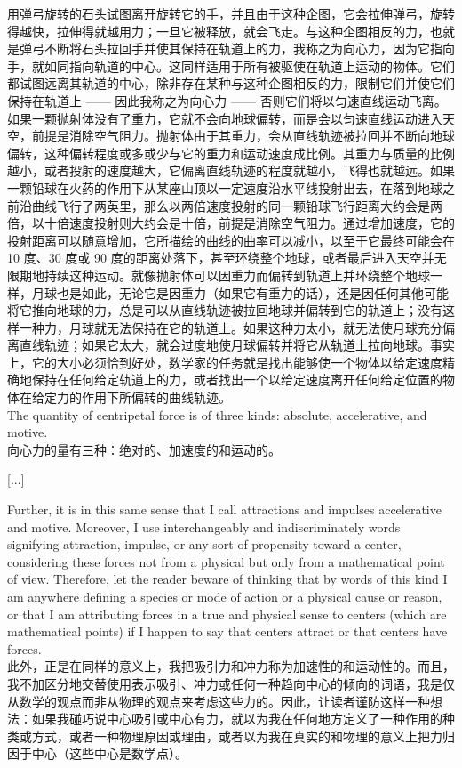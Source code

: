 \documentclass{article}
\begin{document}
用弹弓旋转的石头试图离开旋转它的手，并且由于这种企图，它会拉伸弹弓，旋转得越快，拉伸得就越用力；一旦它被释放，就会飞走。与这种企图相反的力，也就是弹弓不断将石头拉回手并使其保持在轨道上的力，我称之为向心力，因为它指向手，就如同指向轨道的中心。这同样适用于所有被驱使在轨道上运动的物体。它们都试图远离其轨道的中心，除非存在某种与这种企图相反的力，限制它们并使它们保持在轨道上 —— 因此我称之为向心力 —— 否则它们将以匀速直线运动飞离。如果一颗抛射体没有了重力，它就不会向地球偏转，而是会以匀速直线运动进入天空，前提是消除空气阻力。抛射体由于其重力，会从直线轨迹被拉回并不断向地球偏转，这种偏转程度或多或少与它的重力和运动速度成比例。其重力与质量的比例越小，或者投射的速度越大，它偏离直线轨迹的程度就越小，飞得也就越远。如果一颗铅球在火药的作用下从某座山顶以一定速度沿水平线投射出去，在落到地球之前沿曲线飞行了两英里，那么以两倍速度投射的同一颗铅球飞行距离大约会是两倍，以十倍速度投射则大约会是十倍，前提是消除空气阻力。通过增加速度，它的投射距离可以随意增加，它所描绘的曲线的曲率可以减小，以至于它最终可能会在 10 度、30 度或 90 度的距离处落下，甚至环绕整个地球，或者最后进入天空并无限期地持续这种运动。就像抛射体可以因重力而偏转到轨道上并环绕整个地球一样，月球也是如此，无论它是因重力（如果它有重力的话），还是因任何其他可能将它推向地球的力，总是可以从直线轨迹被拉回地球并偏转到它的轨道上；没有这样一种力，月球就无法保持在它的轨道上。如果这种力太小，就无法使月球充分偏离直线轨迹；如果它太大，就会过度地使月球偏转并将它从轨道上拉向地球。事实上，它的大小必须恰到好处，数学家的任务就是找出能够使一个物体以给定速度精确地保持在任何给定轨道上的力，或者找出一个以给定速度离开任何给定位置的物体在给定力的作用下所偏转的曲线轨迹。\\

\noindent The quantity of centripetal force is of three kinds: absolute, accelerative, and motive.\\
向心力的量有三种：绝对的、加速度的和运动的。\\

\begin{center}
    [...]
\end{center}

\noindent Further, it is in this same sense that I call attractions and impulses accelerative and motive. Moreover, I use interchangeably and indiscriminately words signifying attraction, impulse, or any sort of propensity toward a center, considering these forces not from a physical but only from a mathematical point of view. Therefore, let the reader beware of thinking that by words of this kind I am anywhere defining a species or mode of action or a physical cause or reason, or that I am attributing forces in a true and physical sense to centers (which are mathematical points) if I happen to say that centers attract or that centers have forces.\\
此外，正是在同样的意义上，我把吸引力和冲力称为加速性的和运动性的。而且，我不加区分地交替使用表示吸引、冲力或任何一种趋向中心的倾向的词语，我是仅从数学的观点而非从物理的观点来考虑这些力的。因此，让读者谨防这样一种想法：如果我碰巧说中心吸引或中心有力，就以为我在任何地方定义了一种作用的种类或方式，或者一种物理原因或理由，或者以为我在真实的和物理的意义上把力归因于中心（这些中心是数学点）。\\
\end{document}
